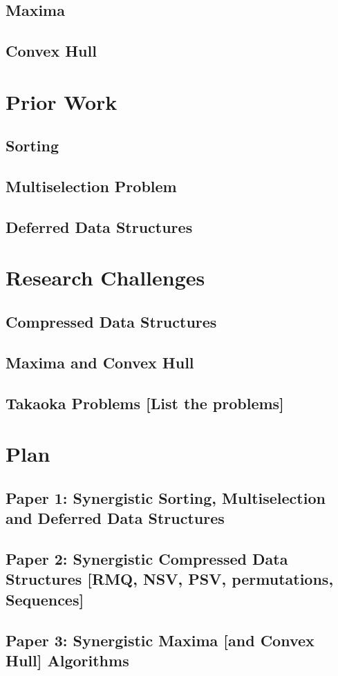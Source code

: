 \subsection{Maxima}

\subsection{Convex Hull}

\section{Prior Work}

\subsection{Sorting}

\subsection{Multiselection Problem}

\subsection{Deferred Data Structures}

\section{Research Challenges}

\subsection{Compressed Data Structures}

\subsection{Maxima and Convex Hull}

\subsection{Takaoka Problems [List the problems]}

\section{Plan}

\subsection{Paper 1: Synergistic Sorting, Multiselection and Deferred
  Data Structures}

\subsection{Paper 2: Synergistic Compressed Data Structures [RMQ,
  NSV, PSV, permutations, Sequences]}

\subsection{Paper 3: Synergistic Maxima [and Convex Hull] Algorithms}

